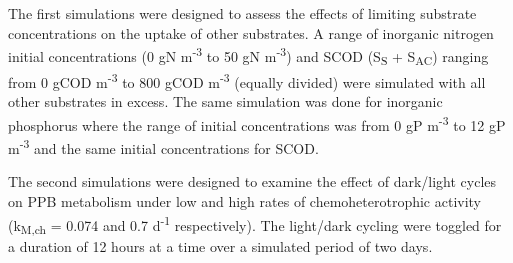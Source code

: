 The first simulations were designed to assess the effects of limiting substrate concentrations on the uptake of other substrates. A range of inorganic nitrogen initial concentrations (0 gN m\textsuperscript{-3} to 50 gN m\textsuperscript{-3}) and SCOD (S\textsubscript{S} + S\textsubscript{AC}) ranging from 0 gCOD m\textsuperscript{-3} to 800 gCOD m\textsuperscript{-3} (equally divided) were simulated with all other substrates in excess. The same simulation was done for inorganic phosphorus where the range of initial concentrations was from 0 gP m\textsuperscript{-3} to 12 gP m\textsuperscript{-3} and the same initial concentrations for SCOD. 

The second simulations were designed to examine the effect of dark/light cycles on PPB metabolism under low and high rates of chemoheterotrophic activity (k\textsubscript{M,ch} = 0.074 and 0.7 d\textsuperscript{-1} respectively). The light/dark cycling were toggled for a duration of 12 hours at a time over a simulated period of two days. 





